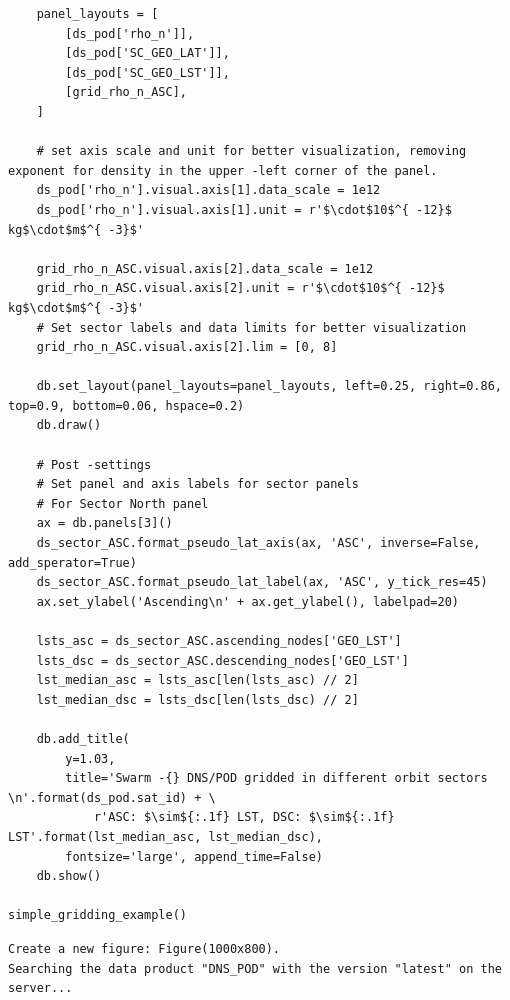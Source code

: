 \begin{verbatim}
    panel_layouts = [
        [ds_pod['rho_n']],
        [ds_pod['SC_GEO_LAT']],
        [ds_pod['SC_GEO_LST']],
        [grid_rho_n_ASC],
    ]
    
    # set axis scale and unit for better visualization, removing exponent for density in the upper -left corner of the panel.
    ds_pod['rho_n'].visual.axis[1].data_scale = 1e12 
    ds_pod['rho_n'].visual.axis[1].unit = r'$\cdot$10$^{ -12}$ kg$\cdot$m$^{ -3}$'
    
    grid_rho_n_ASC.visual.axis[2].data_scale = 1e12
    grid_rho_n_ASC.visual.axis[2].unit = r'$\cdot$10$^{ -12}$ kg$\cdot$m$^{ -3}$'
    # Set sector labels and data limits for better visualization
    grid_rho_n_ASC.visual.axis[2].lim = [0, 8]
    
    db.set_layout(panel_layouts=panel_layouts, left=0.25, right=0.86, top=0.9, bottom=0.06, hspace=0.2)
    db.draw()
    
    # Post -settings
    # Set panel and axis labels for sector panels
    # For Sector North panel
    ax = db.panels[3]()
    ds_sector_ASC.format_pseudo_lat_axis(ax, 'ASC', inverse=False, add_sperator=True)
    ds_sector_ASC.format_pseudo_lat_label(ax, 'ASC', y_tick_res=45)
    ax.set_ylabel('Ascending\n' + ax.get_ylabel(), labelpad=20)
    
    lsts_asc = ds_sector_ASC.ascending_nodes['GEO_LST']
    lsts_dsc = ds_sector_ASC.descending_nodes['GEO_LST']
    lst_median_asc = lsts_asc[len(lsts_asc) // 2]
    lst_median_dsc = lsts_dsc[len(lsts_dsc) // 2]
    
    db.add_title(
        y=1.03,
        title='Swarm -{} DNS/POD gridded in different orbit sectors \n'.format(ds_pod.sat_id) + \
            r'ASC: $\sim${:.1f} LST, DSC: $\sim${:.1f} LST'.format(lst_median_asc, lst_median_dsc),
        fontsize='large', append_time=False)
    db.show()
    
simple_gridding_example()
\end{verbatim}

\begin{verbatim}
Create a new figure: Figure(1000x800).
Searching the data product "DNS_POD" with the version "latest" on the server...
\end{verbatim}

